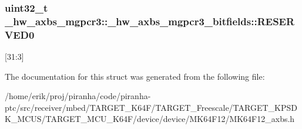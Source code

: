\subsubsection[{\texorpdfstring{R\+E\+S\+E\+R\+V\+E\+D0}{RESERVED0}}]{\setlength{\rightskip}{0pt plus 5cm}uint32\+\_\+t \+\_\+hw\+\_\+axbs\+\_\+mgpcr3\+::\+\_\+hw\+\_\+axbs\+\_\+mgpcr3\+\_\+bitfields\+::\+R\+E\+S\+E\+R\+V\+E\+D0}\hypertarget{struct__hw__axbs__mgpcr3_1_1__hw__axbs__mgpcr3__bitfields_a07218282f03ae2233740e915395ba73b}{}\label{struct__hw__axbs__mgpcr3_1_1__hw__axbs__mgpcr3__bitfields_a07218282f03ae2233740e915395ba73b}
\mbox{[}31\+:3\mbox{]} 

The documentation for this struct was generated from the following file\+:\begin{DoxyCompactItemize}
\item 
/home/erik/proj/piranha/code/piranha-\/ptc/src/receiver/mbed/\+T\+A\+R\+G\+E\+T\+\_\+\+K64\+F/\+T\+A\+R\+G\+E\+T\+\_\+\+Freescale/\+T\+A\+R\+G\+E\+T\+\_\+\+K\+P\+S\+D\+K\+\_\+\+M\+C\+U\+S/\+T\+A\+R\+G\+E\+T\+\_\+\+M\+C\+U\+\_\+\+K64\+F/device/device/\+M\+K64\+F12/M\+K64\+F12\+\_\+axbs.\+h\end{DoxyCompactItemize}
